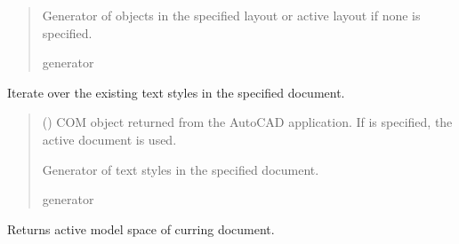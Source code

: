 \documentclass[a4paper,10pt,english]{sphinxmanual}
\begin{document}
\begin{fulllineitems}
\begin{fulllineitems}
\begin{quote}
\begin{description}
\sphinxAtStartPar
Generator of objects in the specified layout or active layout if none is specified.

\sphinxAtStartPar
generator

\end{description}\end{quote}

\end{fulllineitems}


\begin{fulllineitems}
\label{\detokenize{API:pyacad.Autocad.Autocad.iter_text_styles}}
\pysigstartsignatures
{}
\pysigstopsignatures
\sphinxAtStartPar
Iterate over the existing text styles in the specified document.
\begin{quote}\begin{description}
\sphinxAtStartPar
{} (\sphinxstyleliteralemphasis{\sphinxupquote{, }}) \textendash{} COM object returned from the AutoCAD application. If  is specified,
the active document is used.

\sphinxAtStartPar
Generator of text styles in the specified document.

\sphinxAtStartPar
generator

\end{description}\end{quote}

\end{fulllineitems}


\begin{fulllineitems}
\label{\detokenize{API:pyacad.Autocad.Autocad.model}}
\pysigstartsignatures
{}
\pysigstopsignatures
\sphinxAtStartPar
Returns active model space of curring document.

\end{fulllineitems}


\end{fulllineitems}
\end{document}
